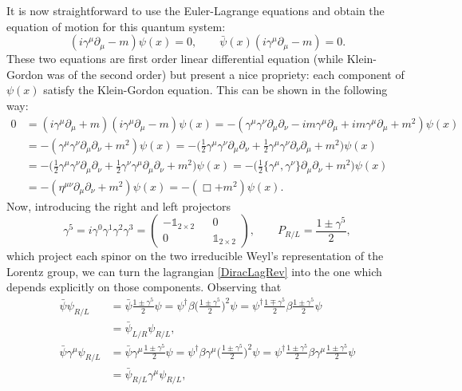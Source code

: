 It is now straightforward to use the Euler-Lagrange equations and obtain the equation of motion for this quantum system:
\begin{equation}
    \label{DiracEqRev} (i\gamma^\mu\partial_\mu-m)\psi(x)=0,\qquad \bar\psi(x)(i\gamma^\mu\partial_\mu-m)=0.
\end{equation}
These two equations are first order linear differential equation (while Klein-Gordon was of the second order) but present a nice propriety: each component of $\psi(x)$ satisfy the Klein-Gordon equation.
This can be shown in the following way:
\begin{align*}
    0&=(i\gamma^\mu\partial_\mu+m)(i\gamma^\mu\partial_\mu-m)\psi(x)=-(\gamma^\mu\gamma^\nu\partial_\mu\partial_\nu-im\gamma^\mu\partial_\mu+im\gamma^\mu\partial_\mu+m^2)\psi(x)\\&=-(\gamma^\mu\gamma^\nu\partial_\mu\partial_\nu+m^2)\psi(x)=-\bigg(\frac{1}{2}\gamma^\mu\gamma^\nu\partial_\mu\partial_\nu+\frac{1}{2}\gamma^\mu\gamma^\nu\partial_\nu\partial_\mu+m^2\bigg)\psi(x)\\&=-\bigg(\frac{1}{2}\gamma^\mu\gamma^\nu\partial_\mu\partial_\nu+\frac{1}{2}\gamma^\nu\gamma^\mu\partial_\mu\partial_\nu+m^2\bigg)\psi(x)=-\bigg(\frac{1}{2}\{\gamma^\mu,\gamma^\nu\}\partial_\mu\partial_\nu +m^2\bigg)\psi(x)\\&=-(\eta^{\mu\nu}\partial_\mu\partial_\nu +m^2)\psi(x)=-(\Box +m^2)\psi(x).
\end{align*}
 Now, introducing the right and left projectors
 \begin{equation*}
    \gamma^5=i\gamma^0\gamma^1\gamma^2\gamma^3=\begin{pmatrix}
        -\mathds{1}_{2\times2}&&0\\0&&\mathds{1}_{2\times2}
    \end{pmatrix},\qquad P_{R/L}=\frac{1\pm\gamma^5}{2},
 \end{equation*}
 which project each spinor on the two irreducible Weyl's representation of the Lorentz group, we can turn the lagrangian \eqref{DiracLagRev} into the one which depends explicitly on those components. Observing that
 \begin{align*}
    \bar\psi\psi_{R/L}&=\bar\psi\frac{1\pm\gamma^5}{2}\psi=\psi^\dagger\beta\bigg(\frac{1\pm\gamma^5}{2}\bigg)^2\psi=\psi^\dagger\frac{1\mp\gamma^5}{2}\beta\frac{1\pm\gamma^5}{2}\psi\\&=\bar\psi_{L/R}\psi_{R/L},\\
    \bar\psi\gamma^\mu\psi_{R/L}&=\bar\psi\gamma^\mu\frac{1\pm\gamma^5}{2}\psi=\psi^\dagger\beta\gamma^\mu\bigg(\frac{1\pm\gamma^5}{2}\bigg)^2\psi=\psi^\dagger\frac{1\pm\gamma^5}{2}\beta\gamma^\mu\frac{1\pm\gamma^5}{2}\psi\\&=\bar\psi_{R/L}\gamma^\mu\psi_{R/L},
 \end{align*}
